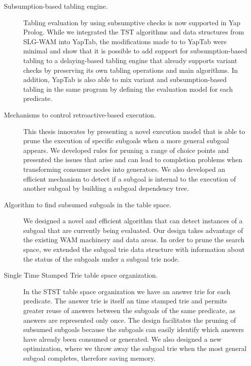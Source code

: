 \begin{description}
   \item[Subsumption-based tabling engine.] Tabling evaluation by using subsumptive checks is now supported in Yap Prolog.
   While we integrated the TST algorithms and data structures from SLG-WAM into YapTab, the modifications made to
   to YapTab were minimal and show that it is possible to add support for subsumption-based tabling to a delaying-based
   tabling engine that already supports variant checks by preserving its own tabling operations and main algorithms.
   In addition, YapTab is also able to mix variant and subsumption-based tabling in the same program by defining
   the evaluation model for each predicate.
   
   \item[Mechanisms to control retroactive-based execution.] This thesis innovates by presenting a novel execution model
   that is able to prune the execution of specific subgoals when a more general subgoal appears. We developed rules
   for pruning a range of choice points and presented the issues that arise and can lead to completion problems when
   transforming consumer nodes into generators. We also developed an efficient mechanism to detect if a subgoal is
   internal to the execution of another subgoal by building a subgoal dependency tree.
   
   \item[Algorithm to find subsumed subgoals in the table space.] We designed a novel and efficient algorithm that
   can detect instances of a subgoal that are currently being evaluated. Our design takes advantage of the existing
   WAM machinery and data areas. In order to prune the search space, we extended the subgoal trie data structure with
   information about the status of the subgoals under a subgoal trie node.
   
   \item[Single Time Stamped Trie table space organization.] In the STST table space organization we have an answer
   trie for each predicate. The answer trie is itself an time stamped trie and permits greater reuse of answers between
   the subgoals of the same predicate, as answers are represented only once. The design facilitates the pruning of
   subsumed subgoals because the subgoals can easily identify which answers have already been consumed or generated.
   We also designed a new optimization, where we throw away the subgoal trie when the most general subgoal completes,
   therefore saving memory.
   

\end{description}

